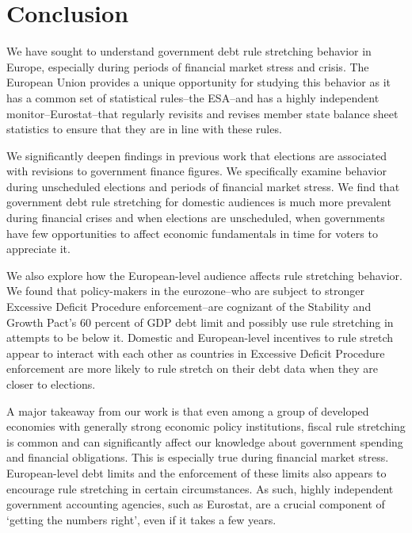 \documentclass[]{article}
\begin{document}
\section{Conclusion}

We have sought to understand government debt rule stretching behavior in Europe, especially during periods of financial market stress and crisis. The European Union provides a unique opportunity for studying this behavior as it has a common set of statistical rules--the ESA--and has a highly independent monitor--Eurostat--that regularly revisits and revises member state balance sheet statistics to ensure that they are in line with these rules.

We significantly deepen findings in previous work that elections are associated with revisions to government finance figures. We specifically examine behavior during unscheduled elections and periods of financial market stress. We find that government debt rule stretching for domestic audiences is much more prevalent during financial crises and when elections are unscheduled, when governments have few opportunities to affect economic fundamentals in time for voters to appreciate it.

We also explore how the European-level audience affects rule stretching behavior. We found that policy-makers in the eurozone--who are subject to stronger Excessive Deficit Procedure enforcement--are cognizant of the Stability and Growth Pact's 60 percent of GDP debt limit and possibly use rule stretching in attempts to be below it. Domestic and European-level incentives to rule stretch appear to interact with each other as countries in Excessive Deficit Procedure enforcement are more likely to rule stretch on their debt data when they are closer to elections.

A major takeaway from our work is that even among a group of developed economies with generally strong economic policy institutions, fiscal rule stretching is common and can significantly affect our knowledge about government spending and financial obligations. This is especially true during financial market stress. European-level debt limits and the enforcement of these limits also appears to encourage rule stretching in certain circumstances. As such, highly independent government accounting agencies, such as Eurostat, are a crucial component of `getting the numbers right', even if it takes a few years.




\pagebreak
\renewcommand{\thepage}{A-\arabic{page}}\setcounter{page}{1}
\renewcommand{\thesection}{Appendix \arabic{section}}\setcounter{section}{0}
\renewcommand{\thetable}{A-\arabic{table}}\setcounter{table}{0}
\renewcommand{\thefigure}{A-\arabic{figure}}\setcounter{figure}{0}
\clearpage
\end{document}
